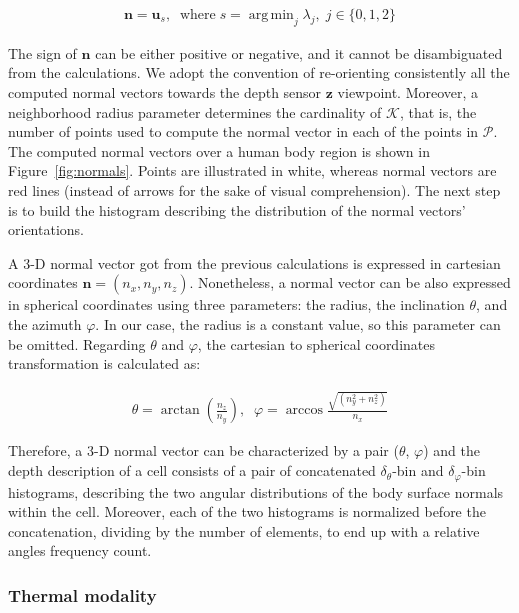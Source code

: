 \documentclass[10pt,twocolumn,letterpaper]{article}
\DeclareMathOperator*{\argmin}{arg\,min}
\begin{document}
\begin{gather}
	\mathbf{n} = \mathbf{u}_s, \;\; \mathrm{where}\;  s = \argmin_{j}{\lambda_j},\; j \in \{0,1,2\}
\end{gather}

The sign of $\mathbf{n}$ can be either positive or negative, and it cannot be disambiguated from the calculations. We adopt the convention of re-orienting consistently all the computed normal vectors towards the depth sensor $\mathbf{z}$ viewpoint. Moreover, a neighborhood radius parameter determines the cardinality of $\mathcal{K}$, that is, the number of points used to compute the normal vector in each of the points in $\mathcal{P}$. The computed normal vectors over a human body region is shown in Figure~\ref{fig:normals}. Points are illustrated in white, whereas normal vectors are red lines (instead of arrows for the sake of visual comprehension). The next step is to build the histogram describing the distribution of the normal vectors' orientations.

A 3-D normal vector got from the previous calculations is expressed in cartesian coordinates $\mathbf{n} = (n_x, n_y, n_z)$. Nonetheless, a normal vector can be also expressed in spherical coordinates using three parameters: the radius, the inclination $\theta$, and the azimuth $\varphi$. In our case, the radius is a constant value, so this parameter can be omitted. Regarding $\theta$ and $\varphi$, the cartesian to spherical coordinates transformation is calculated as:

\begin{gather}	
	\theta  = \arctan{\left( \frac{n_z}{n_y} \right)},\;\;
	\varphi = \arccos{\frac{ \sqrt{(n_y^2 + n_z^2)} }{n_x}}
\end{gather}

Therefore, a 3-D normal vector can be characterized by a pair ($\theta$, $\varphi$) and the depth description of a cell consists of a pair of concatenated $\delta_\theta$-bin and $\delta_\varphi$-bin histograms, describing the two angular distributions of the body surface normals within the cell. Moreover, each of the two histograms is normalized before the concatenation, dividing by the number of elements, to end up with a relative angles frequency count.

\subsubsection{Thermal modality}
\label{sssec:thermal}
\end{document}
